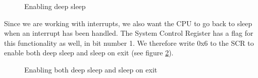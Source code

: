 \begin{figure}[h!]
\caption{Enabling deep sleep}
\label{code:deep_sleep}
\end{figure}

Since we are working with interrupts, we also want the CPU to go back to sleep when an interrupt has been handled.
The System Control Register has a flag for this functionality as well, in bit number 1.
We therefore write 0x6 to the SCR to enable both deep sleep and sleep on exit (see figure \ref{code:deep_sleep_on_exit}).

\begin{figure}[h!]
\caption{Enabling both deep sleep and sleep on exit}
\label{code:deep_sleep_on_exit}
\end{figure}
